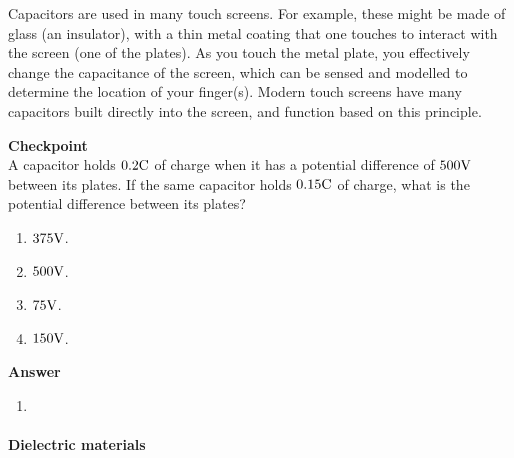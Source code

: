 Capacitors are used in many touch screens. For example, these might be made of glass (an insulator), with a thin metal coating that one touches to interact with the screen (one of the plates). As you touch the metal plate, you effectively change the capacitance of the screen, which can be sensed and modelled to determine the location of your finger(s). Modern touch screens have many capacitors built directly into the screen, and function based on this principle.

\begin{framed}
\textbf{Checkpoint}\\
A capacitor holds $0.2 {\rm C}$ of charge when it has a potential difference of $500 {\rm V}$ between its plates. If the same capacitor holds $0.15 {\rm C}$ of charge,  what is the potential difference between its plates?

\begin{enumerate}
\item $375 {\rm V}$.
\item $500 {\rm V}$.
\item $75 {\rm V}$.
\item $150 {\rm V}$.
\end{enumerate}

\begin{framed}
\textbf{Answer}\\
\begin{enumerate}
\item
\end{enumerate}
\end{framed}
\end{framed}

\paragraph{Dielectric materials}

